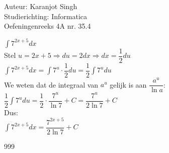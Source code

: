 \documentclass[a4paper]{article}
\begin{document}
\noindent \large Auteur: Karanjot Singh \\
\noindent \large Studierichting: Informatica \\
\noindent \large Oefeningenreeks 4A nr. 35.4 \\

\normalsize

$\displaystyle\int 7^{2x + 5} dx$ \\

Stel $u = 2x + 5 \Rightarrow du = 2 dx \Rightarrow dx = \dfrac{1}{2} du$ \\

$\displaystyle\int 7^{2x + 5} dx = \displaystyle\int 7^u \cdot \dfrac{1}{2} du = \dfrac{1}{2} \displaystyle\int 7^u du$ \\

We weten dat de integraal van $a^u$ gelijk is aan $\dfrac{a^u}{\ln a}$: \\

$\dfrac{1}{2} \displaystyle\int 7^u du = \dfrac{1}{2} \cdot \dfrac{7^u}{\ln 7} + C = \dfrac{7^u}{2 \ln 7} + C$ \\

Dus: \\

$\displaystyle\int 7^{2x + 5} dx = \dfrac{7^{2x + 5}}{2 \ln 7} + C$ \\

\begin{thebibliography}{999}
\end{thebibliography}
\end{document}
